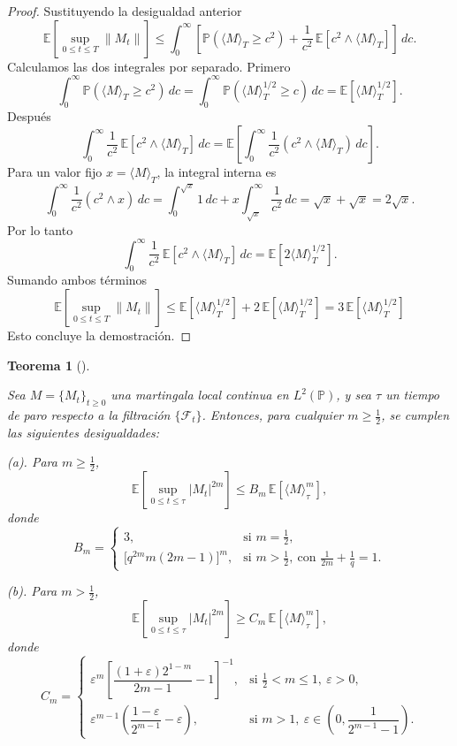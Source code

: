 \documentclass[
  spanish,
  us-letterpaper,
]{scrreprt}
\theoremstyle{plain}
\newtheorem{theorem}{Teorema}[chapter]
\theoremstyle{plain}
\theoremstyle{definition}
\theoremstyle{remark}
\begin{document}
\begin{proof}
Sustituyendo la desigualdad anterior
\[\mathbb{E}\left[ \sup_{0 \leq t \leq T} \|M_t\| \right] \leq \int_0^\infty \left[ \mathbb{P}\left( \langle M \rangle_T \geq c^2 \right) + \frac{1}{c^2} \, \mathbb{E}\left[ c^2 \wedge \langle M \rangle_T \right] \right] \, dc.\]
Calculamos las dos integrales por separado. Primero
\[\int_0^\infty \mathbb{P}\left( \langle M \rangle_T \geq c^2 \right) \, dc = \int_0^\infty \mathbb{P}\left( \langle M \rangle_T^{1/2} \geq c \right) \, dc = \mathbb{E}\left[ \langle M \rangle_T^{1/2} \right].\]
Después
\[ \int_0^\infty \frac{1}{c^2} \, \mathbb{E}\left[ c^2 \wedge \langle M \rangle_T \right] \, dc = \mathbb{E}\left[ \int_0^\infty \frac{1}{c^2} (c^2 \wedge \langle M \rangle_T) \, dc \right].\]
Para un valor fijo \(x = \langle M \rangle_T\), la integral interna es
\[ \int_0^\infty \frac{1}{c^2} (c^2 \wedge x) \, dc = \int_0^{\sqrt{x}} 1 \, dc + x \int_{\sqrt{x}}^\infty \frac{1}{c^2} \, dc = \sqrt{x} + \sqrt{x} = 2 \sqrt{x}.\]
Por lo tanto
\[\int_0^\infty \frac{1}{c^2} \, \mathbb{E}\left[ c^2 \wedge \langle M \rangle_T \right] \, dc = \mathbb{E}\left[ 2 \langle M \rangle_T^{1/2} \right].\]
Sumando ambos términos
\[\mathbb{E}\left[ \sup_{0 \leq t \leq T} \|M_t\| \right] \leq \mathbb{E}\left[ \langle M \rangle_T^{1/2} \right] + 2 \, \mathbb{E}\left[ \langle M \rangle_T^{1/2} \right] = 3 \, \mathbb{E}\left[ \langle M \rangle_T^{1/2} \right]\]
Esto concluye la demostración.
\end{proof}

\begin{theorem}[]\protect\hypertarget{thm-Desigualdad_Burkholder_Davis_Gundy}{}\label{thm-Desigualdad_Burkholder_Davis_Gundy}

Sea \(M = \{M_t\}_{t \geq 0}\) una martingala local continua en
\(L^2(\mathbb{P})\), y sea \(\tau\) un tiempo de paro respecto a la
filtración \(\{\mathcal{F}_t\}\). Entonces, para cualquier
\(m \geq \tfrac{1}{2}\), se cumplen las siguientes desigualdades:

(a). Para \(m \geq \tfrac{1}{2}\),
\[ \mathbb{E}\left[ \sup_{0 \leq t \leq \tau} |M_t|^{2m} \right] \leq B_m \, \mathbb{E}\left[ \langle M \rangle_\tau^m \right],\]
donde \[ B_m =
        \begin{cases}
            3, & \text{si } m = \tfrac{1}{2}, \\
            \bigl[ q^{2m} m (2m - 1) \bigr]^m, & \text{si } m > \tfrac{1}{2},\ \text{con } \frac{1}{2m} + \frac{1}{q} = 1.
        \end{cases}\]

(b). Para \(m > \tfrac{1}{2}\),
\[\mathbb{E}\left[ \sup_{0 \leq t \leq \tau} |M_t|^{2m} \right] \geq C_m \, \mathbb{E}\left[ \langle M \rangle_\tau^m \right],\]
donde \[C_m =
        \begin{cases}
            \varepsilon^m \left[ \dfrac{(1+\varepsilon)2^{1-m}}{2m-1} - 1 \right]^{-1}, & \text{si } \tfrac{1}{2} < m \leq 1,\ \varepsilon > 0, \\
            \varepsilon^{m-1} \left( \dfrac{1-\varepsilon}{2^{m-1}} - \varepsilon \right), & \text{si } m > 1,\ \varepsilon \in \left(0, \dfrac{1}{2^{m-1}-1} \right).
        \end{cases}\]

\end{theorem}
\end{document}
